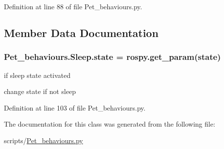 Definition at line 88 of file Pet\+\_\+behaviours.\+py.



\subsection{Member Data Documentation}
\subsubsection[{\texorpdfstring{state}{state}}]{\setlength{\rightskip}{0pt plus 5cm}Pet\+\_\+behaviours.\+Sleep.\+state = rospy.\+get\+\_\+param(\textquotesingle{}state\textquotesingle{})\hspace{0.3cm}{\ttfamily [static]}}\hypertarget{classPet__behaviours_1_1Sleep_a896626409cc2d477e99165f69de520de}{}\label{classPet__behaviours_1_1Sleep_a896626409cc2d477e99165f69de520de}


if sleep state activated 

change state if not sleep 

Definition at line 103 of file Pet\+\_\+behaviours.\+py.



The documentation for this class was generated from the following file\+:\begin{DoxyCompactItemize}
\item 
scripts/\hyperlink{Pet__behaviours_8py}{Pet\+\_\+behaviours.\+py}\end{DoxyCompactItemize}
